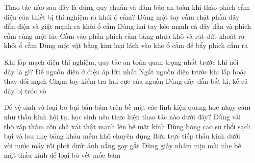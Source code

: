



\begin{ex}
Thao tác nào sau đây là đúng quy chuẩn và đảm bảo an toàn khi tháo phích cắm điện của thiết bị thí nghiệm ra khỏi ổ cắm?
\choice
{Dùng một tay cầm chặt phần dây dẫn điện và giật mạnh ra khỏi ổ cắm}
{Dùng hai tay kéo mạnh cả dây dẫn và phích cắm cùng một lúc}
{\True Cầm vào phần phích cắm bằng nhựa khô và rút dứt khoát ra khỏi ổ cắm}
{Dùng một vật bằng kim loại lách vào khe ổ cắm để bẩy phích cắm ra}
\end{ex}

\begin{ex}
Khi lắp mạch điện thí nghiệm, quy tắc an toàn quan trọng nhất trước khi nối dây là gì?
\choice
{Để nguồn điện ở điện áp lớn nhất}
{\True Ngắt nguồn điện trước khi lắp hoặc thay đổi mạch}
{Chạm tay kiểm tra hai cực của nguồn}
{Dùng dây dẫn bất kì, kể cả dây bị tróc vỏ}
\end{ex}

\begin{ex}
Để vệ sinh và loại bỏ bụi bẩn bám trên bề mặt các linh kiện quang học nhạy cảm như thấu kính hội tụ, học sinh nên thực hiện thao tác nào dưới đây?
\choice
{Dùng vải thô ráp thấm cồn chà xát thật mạnh lên bề mặt kính}
{\True Dùng bóng cao su thổi sạch bụi và lau nhẹ bằng khăn mềm khô chuyên dụng}
{Rửa trực tiếp thấu kính dưới vòi nước máy rồi phơi dưới ánh nắng gay gắt}
{Dùng giấy nhám mịn mài nhẹ bề mặt thấu kính để loại bỏ vết mốc bám}
\end{ex}

